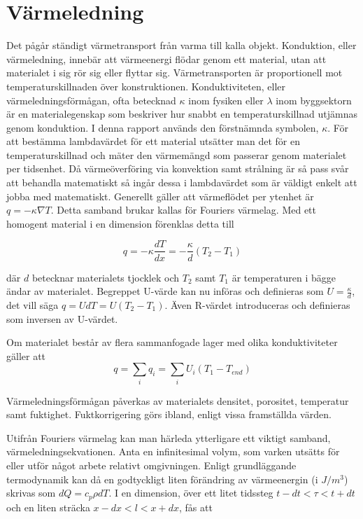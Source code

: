 \section{Värmeledning}\label{sec:heatconduction}

Det pågår ständigt värmetransport från varma till kalla objekt. Konduktion, eller värmeledning, innebär att värmeenergi flödar genom ett material, utan att materialet i sig rör sig eller flyttar sig. Värmetransporten är proportionell mot temperaturskillnaden över konstruktionen. Konduktiviteten, eller värmeledningsförmågan, ofta betecknad $\kappa$ inom fysiken eller $\lambda$ inom byggsektorn är en materialegenskap som beskriver hur snabbt en temperaturskillnad utjämnas genom konduktion. I denna rapport används den förstnämnda symbolen, $\kappa$. För att bestämma lambdavärdet för ett material utsätter man det för en temperaturskillnad och mäter den värmemängd som passerar genom materialet per tidsenhet. Då värmeöverföring via konvektion samt strålning är så pass svår att behandla matematiskt så ingår dessa i lambdavärdet som är väldigt enkelt att jobba med matematiskt. Generellt gäller att värmeflödet per ytenhet är $q = - \kappa \nabla T$. Detta samband brukar kallas för Fouriers värmelag. Med ett homogent material i en dimension förenklas detta till

\begin{equation}\boxed{ \; \; \;
q = -\kappa \frac{dT}{dx} = -\frac{\kappa}{d}\left( T_2-T_1\right)
\; \; \; }
\end{equation}

där $d$ betecknar materialets tjocklek och $T_2$ samt $T_1$ är temperaturen i bägge ändar av materialet. Begreppet U-värde kan nu införas och definieras som $U = \frac{\kappa}{d}$, det vill säga $q = UdT = U\left( T_2-T_1 \right)$. Även R-värdet introduceras och definieras som inversen av U-värdet.

Om materialet består av flera sammanfogade lager med olika konduktiviteter gäller att
\begin{equation}
q = \sum_i q_i = \sum_i U_i \left( T_{1} - T_{end} \right)
\end{equation} 

Värmeledningsförmågan påverkas av materialets densitet, porositet, temperatur samt fuktighet. Fuktkorrigering görs ibland, enligt vissa framställda värden.

Utifrån Fouriers värmelag kan man härleda ytterligare ett viktigt samband, värmeledningsekvationen. Anta en infinitesimal volym, som varken utsätts för eller utför något arbete relativt omgivningen. Enligt grundläggande termodynamik kan då en godtyckligt liten förändring av värmeenergin (i $\unit{}{J/m^3}$) skrivas som $dQ = c_p \rho dT$.  I en dimension, över ett litet tidssteg $t-dt< \tau < t+dt$ och en liten sträcka $x-dx < l < x+dx$, fås att

